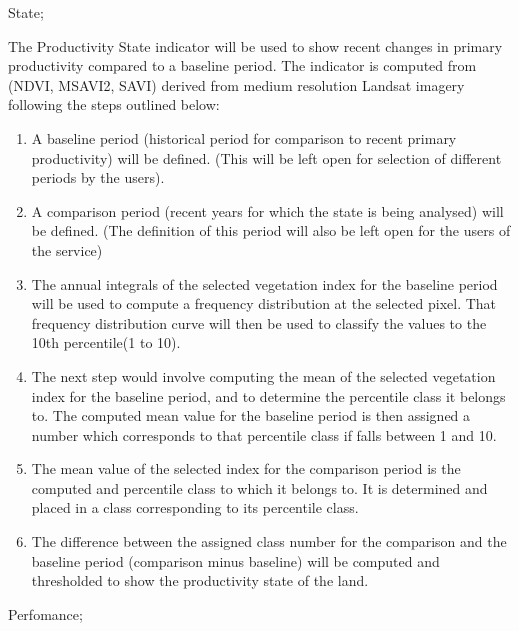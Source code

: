 \documentclass[letterpaper,10pt,english]{sphinxmanual}
\begin{document}
\sphinxAtStartPar
State;

\sphinxAtStartPar
The Productivity State indicator will be used to show recent changes in primary productivity compared to a baseline period. The indicator is computed from (NDVI, MSAVI2, SAVI) derived from medium resolution Landsat imagery following the steps outlined below:
\begin{enumerate}
%
\item {} 
\sphinxAtStartPar
A baseline period (historical period for comparison to recent primary productivity) will be defined. (This will be left open for selection of different periods by the users).

\item {} 
\sphinxAtStartPar
A comparison period (recent years for which the state is being analysed) will be defined. (The definition of this period will also be left open for the users of the service)

\item {} 
\sphinxAtStartPar
The annual integrals of the selected vegetation index for the baseline period will be used to compute a frequency distribution at the selected pixel. That frequency distribution curve will then be used to classify the values to the 10th percentile(1 to 10).

\item {} 
\sphinxAtStartPar
The next step would involve computing the mean of the selected vegetation index for the baseline period, and to determine the percentile class it belongs to. The computed mean value for the baseline period is then assigned a number which corresponds to that percentile class if falls between 1 and 10.

\item {} 
\sphinxAtStartPar
The mean value of the selected index for the comparison period is the computed and percentile class to which it belongs to. It is determined and placed in a class corresponding to its percentile class.

\item {} 
\sphinxAtStartPar
The difference between the assigned class number for the comparison and the baseline period (comparison minus baseline) will be computed and thresholded to show the productivity state of the land.

\end{enumerate}

\sphinxAtStartPar
Perfomance;
\end{document}
